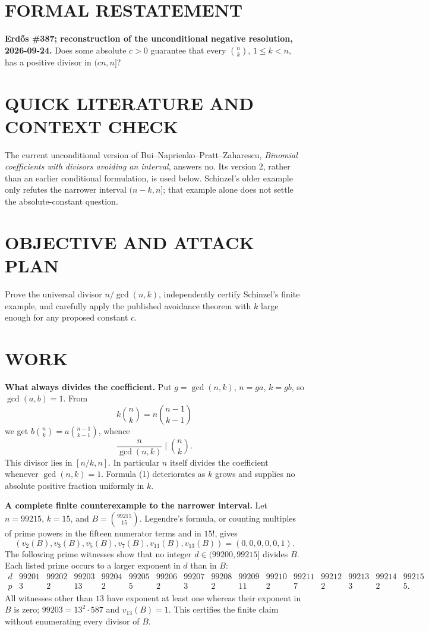 \section{FORMAL RESTATEMENT}
\textbf{Erd\H{o}s \#387; reconstruction of the unconditional negative resolution, 2026-09-24.}
Does some absolute $c>0$ guarantee that every $\binom nk$, $1\leq k<n$, has a positive divisor in $(cn,n]$?

\section{QUICK LITERATURE AND CONTEXT CHECK}
The current unconditional version of Bui--Naprienko--Pratt--Zaharescu, \emph{Binomial coefficients with divisors avoiding an interval}, answers no. Its version 2, rather than an earlier conditional formulation, is used below. Schinzel's older example only refutes the narrower interval $(n-k,n]$; that example alone does not settle the absolute-constant question.

\section{OBJECTIVE AND ATTACK PLAN}
Prove the universal divisor $n/\gcd(n,k)$, independently certify Schinzel's finite example, and carefully apply the published avoidance theorem with $k$ large enough for any proposed constant $c$.

\section{WORK}
\textbf{What always divides the coefficient.} Put $g=\gcd(n,k)$, $n=ga$, $k=gb$, so $\gcd(a,b)=1$. From
\[
k\binom nk=n\binom{n-1}{k-1}
\]
we get $b\binom nk=a\binom{n-1}{k-1}$, whence
\[
\frac n{\gcd(n,k)}\mid\binom nk.                          \tag{1}
\]
This divisor lies in $[n/k,n]$. In particular $n$ itself divides the coefficient whenever $\gcd(n,k)=1$. Formula (1) deteriorates as $k$ grows and supplies no absolute positive fraction uniformly in $k$.

\textbf{A complete finite counterexample to the narrower interval.} Let $n=99215$, $k=15$, and $B=\binom{99215}{15}$. Legendre's formula, or counting multiples of prime powers in the fifteen numerator terms and in $15!$, gives
\[
(v_2(B),v_3(B),v_5(B),v_7(B),v_{11}(B),v_{13}(B))=(0,0,0,0,0,1).
\]
The following prime witnesses show that no integer $d\in(99200,99215]$ divides $B$. Each listed prime occurs to a larger exponent in $d$ than in $B$:
\[
\begin{array}{c|rrrrrrrrrrrrrrr}
d&99201&99202&99203&99204&99205&99206&99207&99208&99209&99210&99211&99212&99213&99214&99215\\
p&3&2&13&2&5&2&3&2&11&2&7&2&3&2&5.
\end{array}
\]
All witnesses other than $13$ have exponent at least one whereas their exponent in $B$ is zero; $99203=13^2\cdot587$ and $v_{13}(B)=1$. This certifies the finite claim without enumerating every divisor of $B$.

